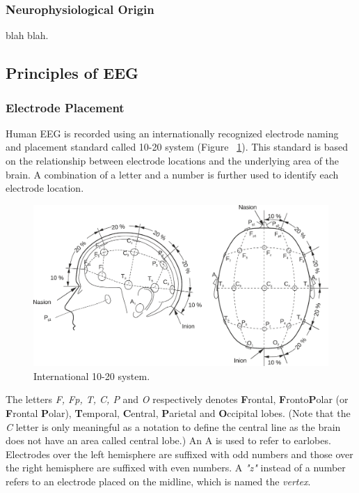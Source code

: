 \documentclass[12pt]{article}
\newcommand\mysubsection[1]{\subsection{#1}}
\newcommand\mysubsubsection[1]{\subsubsection{#1}}
\numberwithin{equation}{section}
\numberwithin{figure}{section}
\numberwithin{table}{section}
\begin{document}
\mysubsubsection{Neurophysiological Origin}\label{seq:origin}
\par{
    blah blah.
}


\mysubsection{Principles of EEG}\label{seq:eeg_principles}

\mysubsubsection{Electrode Placement}\label{seq:eeg_placement}
\par{
Human EEG is recorded using an internationally recognized electrode naming and placement
standard called 10-20 system \citep{jasper_ten_1958} (Figure ~\ref{fig:eeg_1020}).
This standard is based on the relationship between electrode locations and the underlying
area of the brain. A combination of a letter and a number is further used to identify each electrode location.
}

\begin{figure}[ht]
    \centering
    \includegraphics[scale=0.75]{images/10_20_bembook_redrawn}
    \caption[International 10-20 system.]{International 10-20 system. \citep{nicolas-alonso_brain_2012}}
    \label{fig:eeg_1020}
\end{figure}

\par{
    The letters \emph{F, Fp, T, C, P} and \emph{O} respectively denotes \textbf{F}rontal, \textbf{F}ronto\textbf{P}olar
    (or \textbf{F}rontal \textbf{P}olar), \textbf{T}emporal, \textbf{C}entral, \textbf{P}arietal and
    \textbf{O}ccipital lobes. (Note that the \emph{C} letter is only meaningful as a notation to define the central line
    as the brain does not have an area called central lobe.) An A is used to refer to earlobes.
    Electrodes over the left hemisphere are suffixed with odd numbers and those over the right hemisphere
    are suffixed with even numbers. A \emph{"z"} instead of a number refers to an electrode placed on the midline, which
    is named the \emph{vertex}.
}
\end{document}
